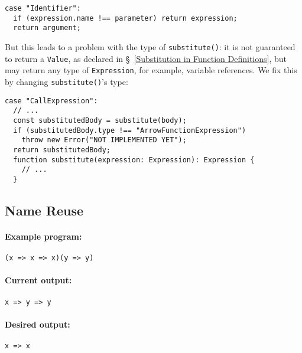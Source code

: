 \documentclass[12pt, oneside]{book}
\begin{document}
\begin{verbatim}
case "Identifier":
  if (expression.name !== parameter) return expression;
  return argument;
\end{verbatim}

But this leads to a problem with the type of \texttt{substitute()}: it is not guaranteed to return a \texttt{Value}, as declared in §~\ref{Substitution in Function Definitions}, but may return any type of \texttt{Expression}, for example, variable references. We fix this by changing \texttt{substitute()}’s type:

\begin{verbatim}
case "CallExpression":
  // ...
  const substitutedBody = substitute(body);
  if (substitutedBody.type !== "ArrowFunctionExpression")
    throw new Error("NOT IMPLEMENTED YET");
  return substitutedBody;
  function substitute(expression: Expression): Expression {
    // ...
  }
\end{verbatim}

\subsection{Name Reuse}

\paragraph{Example program:}

\begin{verbatim}
(x => x => x)(y => y)
\end{verbatim}

\paragraph{Current output:}

\begin{verbatim}
x => y => y
\end{verbatim}

\paragraph{Desired output:}

\begin{verbatim}
x => x
\end{verbatim}

\paragraph{}
\end{document}
